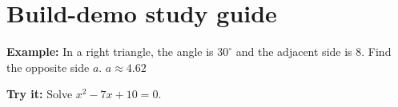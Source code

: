 \documentclass[12pt]{article}
\begin{document}
\section*{Build-demo study guide}
\begin{examplebox}
\textbf{Example:} In a right triangle, the angle is $30^\circ$ and the
adjacent side is $8$. Find the opposite side $a$.
$a \approx \boxed{4.62}$
\end{examplebox}
\begin{tryitbox}
\textbf{Try it:} Solve $x^2 - 7x + 10 = 0$.\\
\end{tryitbox}
\end{document}
